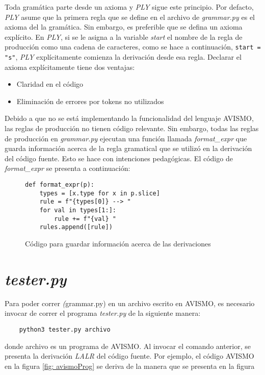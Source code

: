 Toda gramática parte desde un axioma y \textit{PLY} sigue este principio.
Por defacto, \textit{PLY} asume que la primera regla que se define en el archivo de \textit{grammar.py} es el axioma del la gramática.
Sin embargo, es preferible que se defina un axioma explícito.
En \textit{PLY}, si se le asigna a la variable \textit{start} el nombre de la regla de producción como una cadena de caracteres, como se hace a continuación, \texttt{start = "s"}, \textit{PLY} explícitamente comienza la derivación desde esa regla. Declarar el axioma explícitamente tiene dos ventajas:
\begin{itemize}
	\item Claridad en el código
	\item Eliminación de errores por tokens no utilizados
\end{itemize}

Debido a que no se está implementando la funcionalidad del lenguaje AVISMO, las reglas de producción no tienen código relevante. Sin embargo, todas las reglas de producción en \textit{grammar.py} ejecutan una función llamada \textit{format\_expr} que guarda información acerca de la regla gramatical que se utilizó en la derivación del código fuente.
Esto se hace con intenciones pedagógicas.
El código de \textit{format\_expr} se presenta a continuación:
\begin{figure}[H]
	\begin{verbatim}
def format_expr(p):
    types = [x.type for x in p.slice]
    rule = f"{types[0]} --> "
    for val in types[1:]:
        rule += f"{val} "
    rules.append([rule])
\end{verbatim}
	\caption{Código para guardar información acerca de las derivaciones}
	\label{fig: formatExpr}
\end{figure}

\section{\textit{tester.py}}

Para poder correr \textit(grammar.py) en un archivo escrito en AVISMO, es necesario invocar de correr el programa \textit{tester.py} de la siguiente manera:
\begin{verbatim}
	python3 tester.py archivo
\end{verbatim}
donde archivo es un programa de AVISMO. Al invocar el comando anterior, se presenta la derivación \textit{LALR} del código fuente. Por ejemplo, el código AVISMO en la figura \ref{fig: avismoProg} se deriva de la manera que se presenta en la figura

